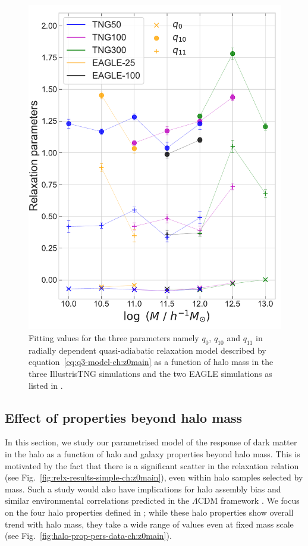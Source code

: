 \begin{figure}
    \centering
    \includegraphics[width=.7\linewidth]{plots/fit_param_q3s_M_TE.pdf}
    \caption{Fitting values for the three parameters namely $q_{0}$, $q_{10}$ and $q_{11}$ in radially dependent quasi-adiabatic relaxation model described by equation~\ref{eq:q3-model-ch:z0main} as a function of halo mass in the three IllustrisTNG simulations and the two EAGLE simulations as listed in .}
    \label{fig:3-param-mass-only-ch:z0main}
\end{figure}
\subsection{Effect of properties beyond halo mass}
\label{sec:dep-on-hal-gal-props-ch:z0main}
In this section, we study our parametrised model of the response of dark matter in the halo as a function of halo and galaxy properties beyond halo mass. This is motivated by the fact that there is a significant scatter in the relaxation relation (see Fig.~\ref{fig:relx-results-simple-ch:z0main}), even within halo samples selected by mass. Such a study would also have implications for halo assembly bias and similar environmental correlations predicted in the $\Lambda$CDM framework  \citep[see, e.g., the discussion in][]{2021arXiv211200026P}. We focus on the four halo properties defined in ; while these halo properties show overall trend with halo mass, they take a wide range of values even at fixed mass scale (see Fig.~\ref{fig:halo-prop-pers-data-ch:z0main}). 


